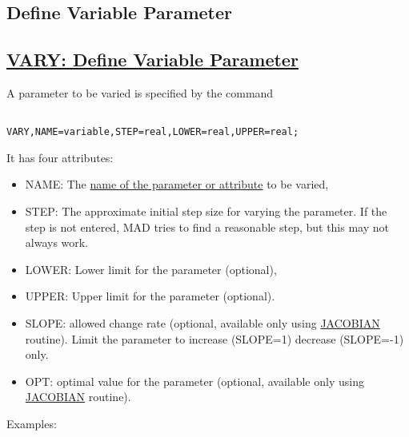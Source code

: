 




\subsection{Define Variable Parameter}



\subsection{\href{vary}{VARY: Define Variable Parameter}} A parameter to be varied is specified by the command 
\begin{verbatim}

VARY,NAME=variable,STEP=real,LOWER=real,UPPER=real;
\end{verbatim} It has four attributes: 
\begin{itemize}
	\item NAME: The \href{../Introduction/variable.html}{name of the parameter or attribute} to be varied, 
	\item STEP: The approximate initial step size for varying the parameter. If the step is not entered, MAD tries to find a reasonable step, but this may not always work. 
	\item LOWER: Lower limit for the parameter (optional), 
	\item UPPER: Upper limit for the parameter (optional). 
	\item SLOPE: allowed change rate (optional, available only using \href{match_xeq.html#jacobian}{JACOBIAN} routine). Limit the parameter to increase (SLOPE=1) decrease (SLOPE=-1) only. 
	\item OPT: optimal value for the parameter (optional, available only using \href{match_xeq.html#jacobian}{JACOBIAN} routine). 
\end{itemize} Examples: 
